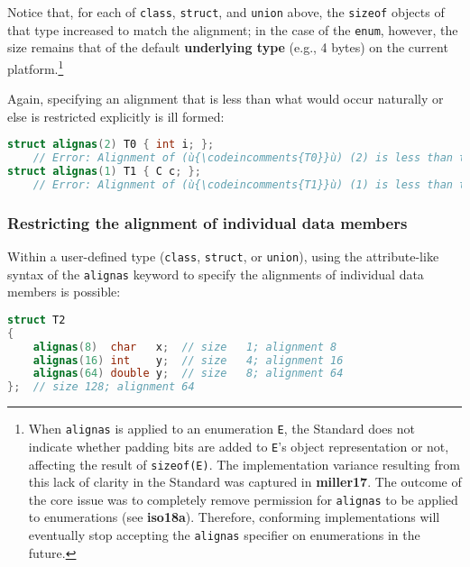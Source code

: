 \noindent Notice that, for each of \texttt{class}, \texttt{struct}, and
\texttt{union} above, the \texttt{sizeof} objects of that type increased
to match the alignment; in the case of the \texttt{enum}, however, the
size remains that of the default \textbf{underlying type} (e.g., 4
bytes) on the current platform.{\cprotect\footnote{When \texttt{alignas}
is applied to an enumeration \texttt{E}, the Standard does not
indicate whether padding bits are added to \texttt{E}'s object
representation or not, affecting the result of \texttt{sizeof(E)}. The
implementation variance resulting from this lack of clarity in the
  Standard was captured in \textbf{miller17}. The outcome of the core
  issue was to completely remove permission for \texttt{alignas} to be
  applied to enumerations (see \textbf{iso18a}). Therefore, conforming implementations will
  eventually stop accepting the \texttt{alignas} specifier on
  enumerations in the future.}}

Again, specifying an alignment that is less than what would occur
naturally or else is restricted explicitly is ill formed:

\begin{lstlisting}[language=C++]
struct alignas(2) T0 { int i; };
    // Error: Alignment of (ù{\codeincomments{T0}}ù) (2) is less than that of (ù{\codeincomments{int}}ù) (4).
struct alignas(1) T1 { C c; };
    // Error: Alignment of (ù{\codeincomments{T1}}ù) (1) is less than that of (ù{\codeincomments{C}}ù) (2).
\end{lstlisting}


\subsubsection[Restricting the alignment of individual data members]{Restricting the alignment of individual data members}\label{restricting-the-alignment-of-individual-data-members}

Within a user-defined type (\texttt{class}, \texttt{struct}, or
\texttt{union}), using the attribute-like syntax of the
\texttt{alignas} keyword to specify the alignments of individual data
members is possible:

\begin{lstlisting}[language=C++]
struct T2
{
    alignas(8)  char   x;  // size   1; alignment 8
    alignas(16) int    y;  // size   4; alignment 16
    alignas(64) double y;  // size   8; alignment 64
};  // size 128; alignment 64
\end{lstlisting}

